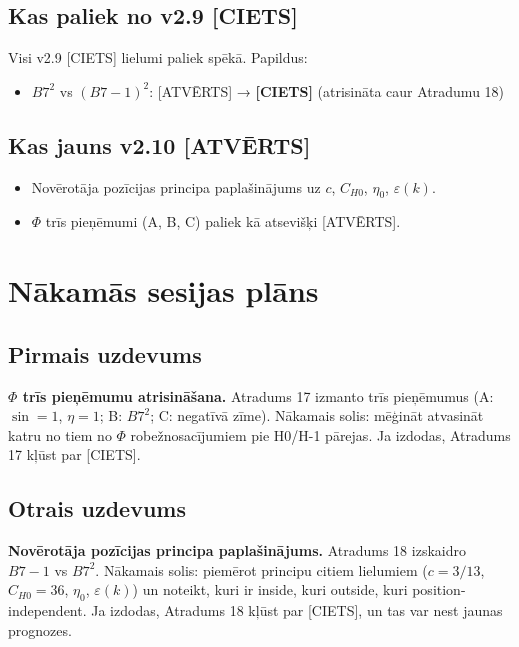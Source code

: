 \documentclass[12pt,a4paper]{article}
\begin{document}
\subsection*{Kas paliek no v2.9 [CIETS]}

Visi v2.9 [CIETS] lielumi paliek spēkā. Papildus:
\begin{itemize}
    \item $B7^2$ vs $(B7-1)^2$: [ATVĒRTS] → \textbf{[CIETS]} (atrisināta caur Atradumu 18)
\end{itemize}

\subsection*{Kas jauns v2.10 [ATVĒRTS]}

\begin{itemize}
    \item Novērotāja pozīcijas principa paplašinājums uz $c$, $C_{H0}$, $\eta_0$, $\varepsilon(k)$.
    \item $\Phi$ trīs pieņēmumi (A, B, C) paliek kā atsevišķi [ATVĒRTS].
\end{itemize}

\newpage

\section{Nākamās sesijas plāns}
\label{sec:plan}

\subsection*{Pirmais uzdevums}

\textbf{$\Phi$ trīs pieņēmumu atrisināšana.} Atradums 17 izmanto trīs pieņēmumus (A: $\sin=1$, $\eta=1$; B: $B7^2$; C: negatīvā zīme). Nākamais solis: mēģināt atvasināt katru no tiem no $\Phi$ robežnosacījumiem pie H0/H-1 pārejas. Ja izdodas, Atradums 17 kļūst par [CIETS].

\subsection*{Otrais uzdevums}

\textbf{Novērotāja pozīcijas principa paplašinājums.} Atradums 18 izskaidro $B7-1$ vs $B7^2$. Nākamais solis: piemērot principu citiem lielumiem ($c = 3/13$, $C_{H0} = 36$, $\eta_0$, $\varepsilon(k)$) un noteikt, kuri ir inside, kuri outside, kuri position-independent. Ja izdodas, Atradums 18 kļūst par [CIETS], un tas var nest jaunas prognozes.
\end{document}
